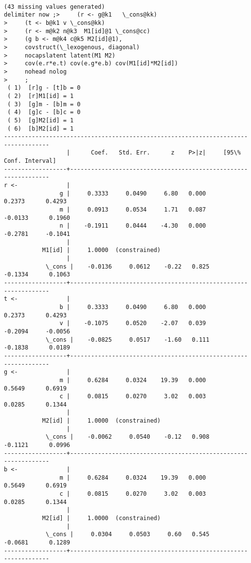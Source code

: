 \documentclass[11pt]{article}
\begin{document}
    \begin{Verbatim}[commandchars=\\\{\}]

(43 missing values generated)
delimiter now ;>     (r <- g@k1   \_cons@kk)
>     (t <- b@k1 v \_cons@kk)
>     (r <- m@k2 n@k3  M1[id]@1 \_cons@cc) 
>     (g b <- m@k4 c@k5 M2[id]@1), 
>     covstruct(\_lexogenous, diagonal)   
>     nocapslatent latent(M1 M2) 
>     cov(e.r*e.t) cov(e.g*e.b) cov(M1[id]*M2[id])
>     nohead nolog 
>     ;
 ( 1)  [r]g - [t]b = 0
 ( 2)  [r]M1[id] = 1
 ( 3)  [g]m - [b]m = 0
 ( 4)  [g]c - [b]c = 0
 ( 5)  [g]M2[id] = 1
 ( 6)  [b]M2[id] = 1
-----------------------------------------------------------------------------------
                  |      Coef.   Std. Err.      z    P>|z|     [95\% Conf. Interval]
------------------+----------------------------------------------------------------
r <-              |
                g |     0.3333     0.0490     6.80   0.000       0.2373      0.4293
                m |     0.0913     0.0534     1.71   0.087      -0.0133      0.1960
                n |    -0.1911     0.0444    -4.30   0.000      -0.2781     -0.1041
                  |
           M1[id] |     1.0000  (constrained)
                  |
            \_cons |    -0.0136     0.0612    -0.22   0.825      -0.1334      0.1063
------------------+----------------------------------------------------------------
t <-              |
                b |     0.3333     0.0490     6.80   0.000       0.2373      0.4293
                v |    -0.1075     0.0520    -2.07   0.039      -0.2094     -0.0056
            \_cons |    -0.0825     0.0517    -1.60   0.111      -0.1838      0.0189
------------------+----------------------------------------------------------------
g <-              |
                m |     0.6284     0.0324    19.39   0.000       0.5649      0.6919
                c |     0.0815     0.0270     3.02   0.003       0.0285      0.1344
                  |
           M2[id] |     1.0000  (constrained)
                  |
            \_cons |    -0.0062     0.0540    -0.12   0.908      -0.1121      0.0996
------------------+----------------------------------------------------------------
b <-              |
                m |     0.6284     0.0324    19.39   0.000       0.5649      0.6919
                c |     0.0815     0.0270     3.02   0.003       0.0285      0.1344
                  |
           M2[id] |     1.0000  (constrained)
                  |
            \_cons |     0.0304     0.0503     0.60   0.545      -0.0681      0.1289
------------------+----------------------------------------------------------------

\end{Verbatim}
\end{document}
